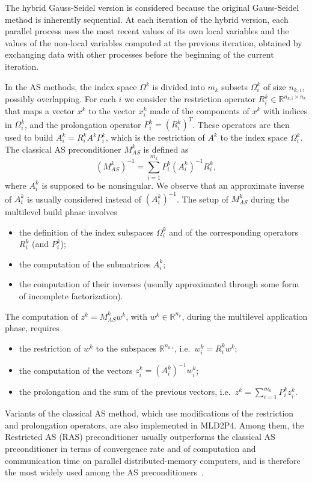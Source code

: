 The hybrid Gauss-Seidel
version is considered because the original Gauss-Seidel method is inherently sequential.
At each iteration of the hybrid version, each parallel process uses the most recent values
of its own local variables and the values of the non-local variables computed at the
previous iteration, obtained by exchanging data with other processes before
the beginning of the current iteration.

In the AS methods, the index space $\Omega^k$ is divided into $m_k$
subsets $\Omega^k_i$ of size $n_{k,i}$,  possibly
overlapping. For each $i$ we consider the restriction
operator $R_i^k \in \mathbb{R}^{n_{k,i} \times n_k}$
that maps a vector $x^k$ to the vector $x_i^k$ made of the components of $x^k$
with indices in $\Omega^k_i$, and the prolongation operator
$P^k_i = (R_i^k)^T$. These operators are then  used to build
$A_i^k=R_i^kA^kP_i^k$, which is the restriction of $A^k$ to the index
space $\Omega^k_i$.
The classical AS preconditioner $M^k_{AS}$ is defined as
\[
    ( M^k_{AS} )^{-1} = \sum_{i=1}^{m_k} P_i^k (A_i^k)^{-1} R_i^{k},
\]
where $A_i^k$ is supposed to be nonsingular. We observe that an approximate
inverse of $A_i^k$ is usually considered instead of $(A_i^k)^{-1}$.
The setup of $M^k_{AS}$ during the multilevel build phase
involves
\begin{itemize}
  \item the definition of the index subspaces $\Omega_i^k$ and of the corresponding 
  operators $R_i^k$ (and $P_i^k$);
  \item the computation of the submatrices $A_i^k$;
  \item the computation of their inverses (usually approximated
    through  some form  of incomplete factorization).
\end{itemize}
The computation of $z^k=M^k_{AS}w^k$, with $w^k \in \mathbb{R}^{n_k}$, during the
multilevel application phase, requires
\begin{itemize}
	\item the restriction of $w^k$ to the subspaces $\mathbb{R}^{n_{k,i}}$,
	  i.e.\ $w_i^k = R_i^{k} w^k$;
	\item the computation of the vectors $z_i^k=(A_i^k)^{-1} w_i^k$;
	\item the prolongation and the sum of the previous vectors,
    i.e.\ $z^k = \sum_{i=1}^{m_k} P_i^k z_i^k$.
\end{itemize}
Variants of the classical AS method, which use modifications of the
restriction and prolongation operators, are also implemented in MLD2P4.
Among them, the Restricted AS (RAS) preconditioner usually
outperforms the classical AS preconditioner in terms of convergence
rate and of computation and communication time on parallel distributed-memory
computers, and is therefore the most widely used among the AS
preconditioners~\cite{CAI_SARKIS}. 

